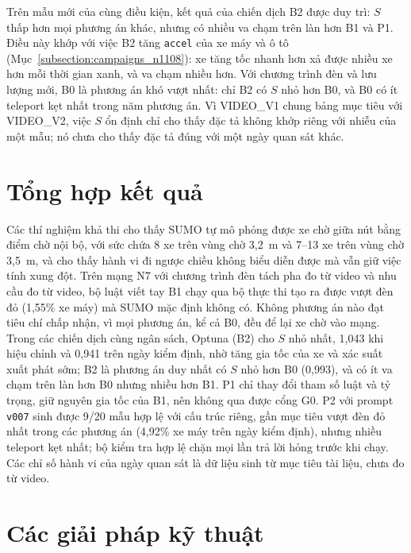 \documentclass[../main.tex]{subfiles}
\begin{document}
Trên mẫu mới của cùng điều kiện, kết quả của chiến dịch B2 được duy trì: $S$ thấp hơn mọi phương án khác, nhưng có nhiều va chạm trên làn hơn B1 và P1. Điều này khớp với việc B2 tăng \texttt{accel} của xe máy và ô tô (Mục~\ref{subsection:campaigns_n1108}): xe tăng tốc nhanh hơn xả được nhiều xe hơn mỗi thời gian xanh, và va chạm nhiều hơn. Với chương trình đèn và lưu lượng mới, B0 là phương án khó vượt nhất: chỉ B2 có $S$ nhỏ hơn B0, và B0 có ít teleport kẹt nhất trong năm phương án. Vì VIDEO\_V1 chung bảng mục tiêu với VIDEO\_V2, việc $S$ ổn định chỉ cho thấy đặc tả không khớp riêng với nhiễu của một mẫu; nó chưa cho thấy đặc tả đúng với một ngày quan sát khác.



\section{Tổng hợp kết quả}
\label{section:results_summary}

Các thí nghiệm khả thi cho thấy SUMO tự mô phỏng được xe chờ giữa nút bằng điểm chờ nội bộ, với sức chứa 8 xe trên vùng chờ 3,2~m và 7--13 xe trên vùng chờ 3,5~m, và cho thấy hành vi đi ngược chiều không biểu diễn được mà vẫn giữ việc tính xung đột. Trên mạng N7 với chương trình đèn tách pha đo từ video và nhu cầu đo từ video, bộ luật viết tay B1 chạy qua bộ thực thi tạo ra được vượt đèn đỏ (1,55\% xe máy) mà SUMO mặc định không có. Không phương án nào đạt tiêu chí chấp nhận, vì mọi phương án, kể cả B0, đều để lại xe chờ vào mạng. Trong các chiến dịch cùng ngân sách, Optuna (B2) cho $S$ nhỏ nhất, 1,043 khi hiệu chỉnh và 0,941 trên ngày kiểm định, nhờ tăng gia tốc của xe và xác suất xuất phát sớm; B2 là phương án duy nhất có $S$ nhỏ hơn B0 (0,993), và có ít va chạm trên làn hơn B0 nhưng nhiều hơn B1. P1 chỉ thay đổi tham số luật và tỷ trọng, giữ nguyên gia tốc của B1, nên không qua được cổng G0. P2 với prompt \texttt{v007} sinh được 9/20 mẫu hợp lệ với cấu trúc riêng, gần mục tiêu vượt đèn đỏ nhất trong các phương án (4,92\% xe máy trên ngày kiểm định), nhưng nhiều teleport kẹt nhất; bộ kiểm tra hợp lệ chặn mọi lần trả lời hỏng trước khi chạy. Các chỉ số hành vi của ngày quan sát là dữ liệu sinh từ mục tiêu tài liệu, chưa đo từ video.

\section{Các giải pháp kỹ thuật}
\label{section:solutions}
\end{document}
